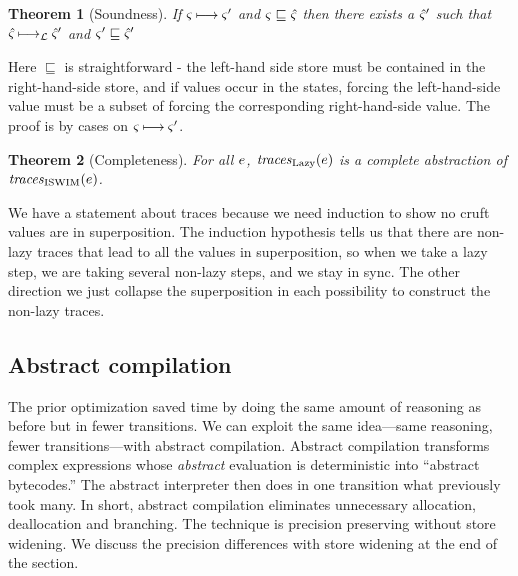 \documentclass[preprint,onecolumn,9pt]{sigplanconf} %
\newtheorem{theorem}{Theorem}
\begin{document}
\spchoice
{
\begin{theorem}[Soundness]
  If $\varsigma \mathbin{\longmapsto} \varsigma'$ and $\varsigma \sqsubseteq
  \hat{\varsigma}$ then there exists a $\hat{\varsigma}'$ such that $\hat{\varsigma}
  \mathbin{\longmapsto_{{\mathcal L}}} \hat{\varsigma}'$ and $\varsigma' \sqsubseteq \hat{\varsigma}'$
\end{theorem}
Here $\sqsubseteq$ is straightforward - the left-hand side store must be
contained in the right-hand-side store, and if values occur in the states, forcing
the left-hand-side value must be a subset of forcing the corresponding right-hand-side value.
The proof is by cases on $\varsigma \mathbin{\longmapsto} \varsigma'$.}
{
\begin{theorem}[Completeness]For all $e$,
 $\mathit{traces}_{\text{Lazy}}(e)$ is a complete abstraction of $\mathit{traces}_{\text{ISWIM}}(e)$.
\end{theorem}
We have a statement about traces because we need induction to show no
cruft values are in superposition.  The induction hypothesis tells us
that there are non-lazy traces that lead to all the values in
superposition, so when we take a lazy step, we are taking several
non-lazy steps, and we stay in sync. The other direction we just
collapse the superposition in each possibility to construct the
non-lazy traces.}


\subsection{Abstract compilation}

The prior optimization saved time by doing the same amount of
reasoning as before but in fewer transitions. We can exploit the same
idea---same reasoning, fewer transitions---with abstract
compilation. Abstract compilation transforms complex expressions whose
\emph{abstract} evaluation is deterministic into ``abstract
bytecodes.''  The abstract interpreter then does in one transition
what previously took many. In short, abstract compilation eliminates
unnecessary allocation, deallocation and branching. The technique is
precision preserving without store widening. We discuss the precision
differences with store widening at the end of the section.
\end{document}
